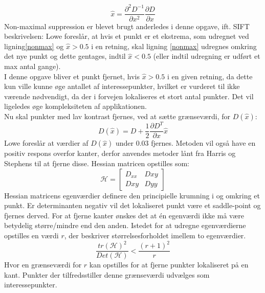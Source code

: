 \begin{equation}
\hat{x}= \dfrac{\partial^2 D^{-1}}{\partial x^2}\dfrac{\partial D}{\partial x}
\label{xhat}
\end{equation}
Non-maximal suppression er blevet brugt anderledes i denne opgave, ift. SIFT beskrivelsen: Lowe foreslår, at hvis et punkt er et ekstrema, som udregnet ved ligning\ref{nonmax} og $\hat{x} > 0.5$ i en retning, skal ligning \eqref{nonmax} udregnes omkring det nye punkt og dette gentages, indtil $\hat{x} < 0.5$ (eller indtil udregning er udført et max antal gange).
\\
I denne opgave bliver et punkt fjernet, hvis $\hat{x} > 0.5$ i en given retning, da dette kun ville kunne øge antallet af interessepunkter, hvilket er vurderet til ikke værende nødvendigt, da der i forvejen lokaliseres et stort antal punkter. Det vil ligeledes øge kompleksiteten af applikationen.
\\
Nu skal punkter med lav kontrast fjernes, ved at sætte grænseværdi, for $D(\hat{x})$:
\begin{equation}
D(\hat{x})=D+\dfrac{1}{2}\dfrac{\partial D^T}{\partial x}\hat{x}
\label{dxhat}
\end{equation}
Lowe foreslår at værdier af $D(\hat{x})$ under 0.03 fjernes. Metoden vil også have en positiv respons overfor kanter, derfor anvendes metoder lånt fra Harris og Stephens \cite{harris} til at fjerne disse. Hessian matricen opstilles som:
\begin{equation}
\mathcal{H} =
\begin{bmatrix}
D_{xx} & D{xy} \\
D{xy} & D{yy}
\end{bmatrix}
\end{equation}
Hessian matricens egenværdier definere den principielle krumning i og omkring et punkt. Er determinanten negativ vil det lokaliseret punkt være et saddle-point og fjernes derved. For at fjerne kanter ønskes det at én egenværdi ikke må være betydelig større/mindre end den anden. Istedet for at udregne egenværdierne opstilles en værdi $r$, der beskriver størrelsesforholdet imellem to egenværdier.
\begin{equation}
\dfrac{tr(\mathcal{H})^2}{Det(\mathcal{H})}<\dfrac{(r+1)^2}{r}
\label{rval}
\end{equation}
Hvor en grænseværdi for $r$ kan opstilles for at fjerne punkter lokaliseret på en kant. Punkter der tilfredsstiller denne grænseværdi udvælges som interessepunkter. 
